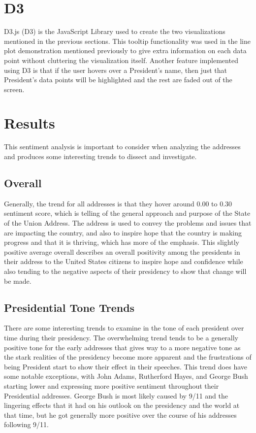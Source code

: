 \section{D3}
D3.js (D3) is the JavaScript Library used to create the two visualizations mentioned in the previous sections.
This tooltip functionality was used in the line plot demonstration mentioned previously to give extra information on each data point without cluttering the visualization itself.
Another feature implemented using D3 is that if the user hovers over a President's name, then just that President's data points will be highlighted and the rest are faded out of the screen.

\section{Results}
This sentiment analysis is important to consider when analyzing the addresses and produces some interesting trends to dissect and investigate.

\subsection{Overall}
Generally, the trend for all addresses is that they hover around 0.00 to 0.30 sentiment score, which is telling of the general approach and purpose of the State of the Union Address.
The address is used to convey the problems and issues that are impacting the country, and also to inspire hope that the country is making progress and that it is thriving, which has more of the emphasis.
This slightly positive average overall describes an overall positivity among the presidents in their address to the United States citizens to inspire hope and confidence while also tending to the negative aspects of their presidency to show that change will be made.

\subsection{Presidential Tone Trends}
There are some interesting trends to examine in the tone of each president over time during their presidency.
The overwhelming trend tends to be a generally positive tone for the early addresses that gives way to a more negative tone as the stark realities of the presidency become more apparent and the frustrations of being President start to show their effect in their speeches.
This trend does have some notable exceptions, with John Adams, Rutherford Hayes, and George Bush starting lower and expressing more positive sentiment throughout their Presidential addresses.
George Bush is most likely caused by 9/11 and the lingering effects that it had on his outlook on the presidency and the world at that time, but he got generally more positive over the course of his addresses following 9/11.

